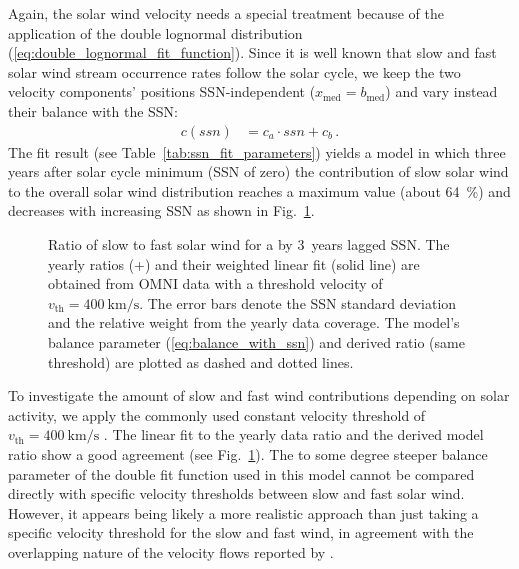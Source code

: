Again, the solar wind velocity needs a special treatment because of the application of the double lognormal distribution (\ref{eq:double_lognormal_fit_function}). Since it is well known that slow and fast solar wind stream occurrence rates follow the solar cycle, we keep the two velocity components' positions SSN-independent ($x_\text{med} =  b_\text{med}$) and vary instead their balance with the SSN:
\begin{align}
	c(ssn) &= c_a \cdot ssn + c_b\,.	\label{eq:balance_with_ssn}
\end{align}
The fit result (see Table~\ref{tab:ssn_fit_parameters}) yields a model in which three years after solar cycle minimum (SSN of zero) the contribution of slow solar wind to the overall solar wind distribution reaches a maximum value (about \SI{64}{\percent}) and decreases with increasing SSN as shown in Fig.~\ref{fig:Vdbl_SSN_ratio_f_plot}.
\begin{figure}
	\caption{Ratio of slow to fast solar wind for a by 3~years lagged SSN. The yearly ratios (+) and their weighted linear fit (solid line) are obtained from OMNI data with a threshold velocity of $v_\text{th} = \SI{400}{\km\per\s}$. The error bars denote the SSN standard deviation and the relative weight from the yearly data coverage. The model's balance parameter (\ref{eq:balance_with_ssn}) and derived ratio (same threshold) are plotted as dashed and dotted lines.}
	\label{fig:Vdbl_SSN_ratio_f_plot}
\end{figure}

To investigate the amount of slow and fast wind contributions depending on solar activity, we apply the commonly used constant velocity threshold of $v_\text{th} = \SI{400}{\km\per\s}$ \citep[p.~144]{Schwenn1990}. The linear fit to the yearly data ratio and the derived model ratio show a good agreement (see Fig.~\ref{fig:Vdbl_SSN_ratio_f_plot}). The to some degree steeper balance parameter of the double fit function used in this model cannot be compared directly with specific velocity thresholds between slow and fast solar wind. However, it appears being likely a more realistic approach than just taking a specific velocity threshold for the slow and fast wind, in agreement with the overlapping nature of the velocity flows reported by \citet{McGregor2011b}.


